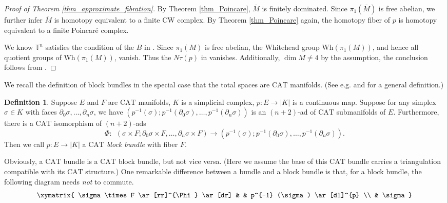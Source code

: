 \documentclass[12pt]{amsart}
\theoremstyle{plain}
\theoremstyle{definition}
\newtheorem{definition}[theorem]{Definition}
\theoremstyle{question}
\theoremstyle{remark}
\theoremstyle{assumption}
\numberwithin{equation}{section}
\theoremstyle{bigthm}
\begin{document}
\begin{proof}[Proof of Theorem \ref{thm_approximate_fibration}]
By Theorem \ref{thm_Poincare}, $\overline{M}$ is finitely dominated. Since $\pi_{1} (\overline{M})$ is free abelian, we further infer $\overline{M}$ is homotopy equivalent to a finite CW complex. By Theorem \ref{thm_Poincare} again, the homotopy fiber of $p$ is homotopy equivalent to a finite Poincar\'{e} complex.

We know $\mathbb{T}^{n}$ satisfies the condition of the $B$ in \cite[Theorem~1.4]{FLS2018}. Since $\pi_{1} (M)$ is free abelian, the Whitehead group $\mathrm{Wh} (\pi_{1} (M))$, and hence all quotient groups of $\mathrm{Wh} (\pi_{1} (M))$, vanish. Thus the $N \tau (p)$ in \cite[Conjecture~1.3]{FLS2018} vanishes. Additionally, $\dim M \ne 4$ by the assumption, the conclusion follows from \cite[Theorem~1.4]{FLS2018}.
\end{proof}

We recall the definition of block bundles in the special case that the total spaces are $\mathrm{CAT}$ manifolds. (See e.g. \cite[p.~473]{Rourke_Sanderson71} and \cite[Definition~2.4]{Ebert_Randal} for a general definition.)
\begin{definition}\label{def_block_bundle}
Suppose $E$ and $F$ are $\mathrm{CAT}$ manifolds, $K$ is a simplicial complex, $p \colon  E \rightarrow |K|$ is a continuous map. Suppose for any simplex $\sigma \in K$ with faces $\partial_{0} \sigma, \dots, \partial_{n} \sigma$, we have $(p^{-1} (\sigma); p^{-1} (\partial_{0} \sigma), \dots, p^{-1} (\partial_{n} \sigma))$ is an $(n+2)$-ad of $\mathrm{CAT}$ submanifolds of $E$. Furthermore, there is a $\mathrm{CAT}$ isomorphism of $(n+2)$-ads
\[
\Phi \colon  \ \ (\sigma \times F; \partial_{0} \sigma \times F, \dots, \partial_{n} \sigma \times F) \rightarrow (p^{-1} (\sigma); p^{-1} (\partial_{0} \sigma), \dots, p^{-1} (\partial_{n} \sigma)).
\]
Then we call $p \colon  E \rightarrow |K|$ a \textit{$\mathrm{CAT}$ block bundle} with fiber $F$.
\end{definition}

Obviously, a $\mathrm{CAT}$ bundle is a $\mathrm{CAT}$ block bundle, but not vice versa. (Here we assume the base of this $\mathrm{CAT}$ bundle carries a triangulation compatible with its $\mathrm{CAT}$ structure.) One remarkable difference between a bundle and a block bundle is that, for a block bundle, the following diagram needs \textit{not} to commute.
\[
\xymatrix{
  \sigma \times F \ar[rr]^{\Phi} \ar[dr]
                &  &    p^{-1} (\sigma) \ar[dl]^{p}    \\
                & \sigma                 }
\]
\end{document}
